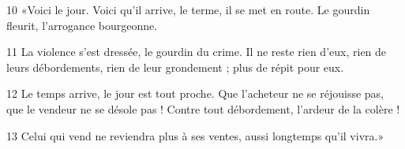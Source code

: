 
10 «Voici le jour. Voici qu’il arrive, le terme, il se met en route. Le gourdin fleurit, l’arrogance bourgeonne.

11 La violence s’est dressée, le gourdin du crime. Il ne reste rien d’eux, rien de leurs débordements, rien de leur grondement ; plus de répit pour eux.

12 Le temps arrive, le jour est tout proche. Que l’acheteur ne se réjouisse pas, que le vendeur ne se désole pas ! Contre tout débordement, l’ardeur de la colère !

13 Celui qui vend ne reviendra plus à ses ventes, aussi longtemps qu’il vivra.»